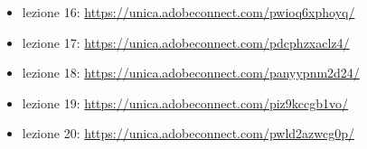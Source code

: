 \documentclass{article}
\begin{document}
\begin{itemize}
\item lezione 16: \url{https://unica.adobeconnect.com/pwioq6xphoyq/}\\
\item lezione 17: \url{https://unica.adobeconnect.com/pdcphzxaclz4/}\\
\item lezione 18: \url{https://unica.adobeconnect.com/panyypnm2d24/}\\
\item lezione 19: \url{https://unica.adobeconnect.com/piz9kccgb1vo/}\\
\item lezione 20: \url{https://unica.adobeconnect.com/pwld2azwcg0p/}\\
\end{itemize}
\end{document}
